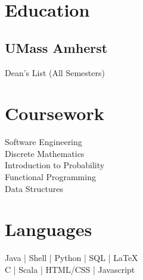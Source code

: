 \documentclass[letterpaper]{deedy-resume} %
\begin{document}
\begin{minipage}[t]{0.32\textwidth} %


\section{Education} 

\subsection{UMass Amherst}

Dean's List (All Semesters) \\
\sectionspace %






\section{Coursework}
\textbullet{} Software Engineering \\
\textbullet{} Discrete Mathematics \\
\textbullet{} Introduction to Probability \\
\textbullet{} Functional Programming \\
\textbullet{} Data Structures \\


\sectionspace %


\section{Languages}


Java | Shell | Python | SQL | \LaTeX\ \\ 
\vspace{2mm}
C | Scala | HTML/CSS | Javascript \\



\end{minipage}
\end{document}
